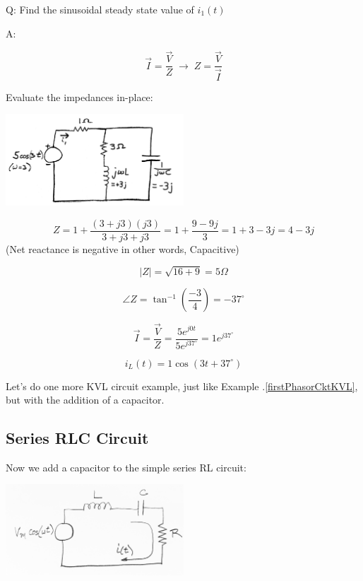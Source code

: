 Q: Find the sinusoidal  steady state value of $i_1(t)$

A:

\[
\vec{I} = \frac{\vec{V}}  {Z} \; \to\; Z = \frac {\vec{V}}  {\vec{I}}
\]

Evaluate the impedances  in-place:

\includegraphics[width=0.5\textwidth]{figsChapt02/ME02007.png}

\[
Z =  1 + \frac{(3 + j3)(j3)}{3 + j3 + j3} = 1 + \frac{9 - 9j}{3} = 1 + 3 - 3j
= 4 - 3j
\]
(Net reactance is negative in other words, Capacitive)

\[
|Z| = \sqrt{16 + 9} = 5\Omega
\]


\[
\angle Z = \tan^{-1}\left(\frac{-3}{4}\right) = -37^\circ
\]

\[
\vec{I} = \frac{\vec{V}}{Z} = \frac{5e^{j0t}}{5e^{j37^\circ}} = 1e^{j37^\circ}
\]

\[\boxed{
i_L(t) = 1\cos(3t + 37^\circ)
}\]




Let's do one more KVL circuit example, just like Example \thechapter.\ref{firstPhasorCktKVL}, but with the addition of a capacitor.


\subsection{Series RLC  Circuit}\label{2ndPhasorCktKVL}

Now we add a capacitor to the simple series RL circuit:

\includegraphics[width=0.5\textwidth]{figsChapt02/EL44497.png}

